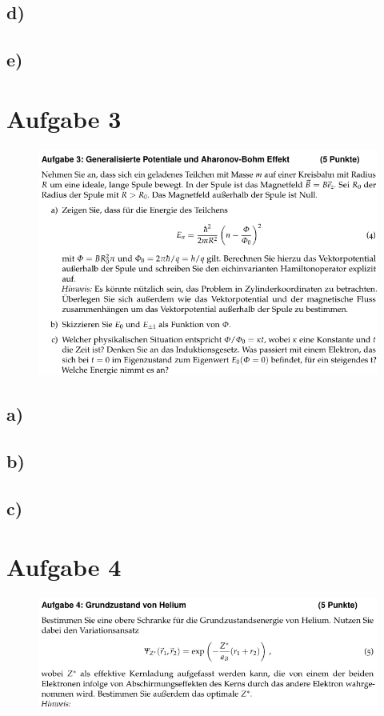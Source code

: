 \subsection{d)}

\subsection{e)}

\section{Aufgabe 3}
\begin{figure}[H]
    \centering
    \includegraphics[width=\textwidth]{images/Aufgabe3.jpg}
\end{figure}

\subsection{a)}

\subsection{b)}

\subsection{c)}

\section{Aufgabe 4}
\begin{figure}[H]
    \centering
    \includegraphics[width=\textwidth]{images/Aufgabe4a.jpg}
\end{figure}

